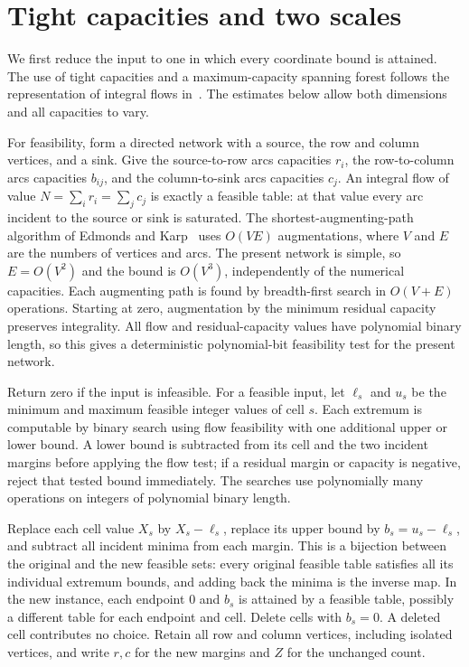 \section{Tight capacities and two scales}\label{sec:scales}

We first reduce the input to one in which every coordinate bound is
attained.  The use of tight capacities and a maximum-capacity spanning
forest follows the representation of integral flows in~\cite{CDR2010}.
The estimates below allow both dimensions and all capacities to vary.

For feasibility, form a directed network with a source, the row and
column vertices, and a sink. Give the source-to-row arcs capacities
$r_i$, the row-to-column arcs capacities $b_{ij}$, and the
column-to-sink arcs capacities $c_j$. An integral flow of value
$N=\sum_i r_i=\sum_j c_j$ is exactly a feasible table: at that value
every arc incident to the source or sink is saturated. The
shortest-augmenting-path algorithm of Edmonds and
Karp~\cite[Theorem~1]{EK1972} uses $O(VE)$ augmentations, where $V$
and $E$ are the numbers of vertices and arcs.  The present network is
simple, so $E=O(V^2)$ and the bound is $O(V^3)$, independently of the
numerical capacities. Each augmenting path is found by breadth-first
search in $O(V+E)$ operations. Starting at zero, augmentation by the
minimum residual capacity preserves integrality. All flow and residual-capacity
values have polynomial binary length, so this gives a deterministic
polynomial-bit feasibility test for the present network.

Return zero if the input is infeasible. For a feasible input, let
$\ell_s$ and $u_s$ be the minimum
and maximum feasible integer values of cell $s$.  Each extremum is
computable by binary search using flow feasibility with one additional
upper or lower bound.  A lower bound is subtracted from its cell and
the two incident margins before applying the flow test; if a residual
margin or capacity is negative, reject that tested bound immediately.
The searches
use polynomially many operations on integers of polynomial binary
length.

Replace each cell value $X_s$ by $X_s-\ell_s$, replace its upper bound
by $b_s=u_s-\ell_s$, and subtract all incident minima from each margin.
This is a bijection between the original and the new feasible sets:
every original feasible table satisfies all its individual extremum
bounds, and adding back the minima is the inverse map.  In the new
instance, each endpoint $0$ and $b_s$ is attained by a feasible table,
possibly a different table for each endpoint and cell.  Delete cells
with $b_s=0$.  A deleted cell contributes no choice.  Retain all row
and column vertices, including isolated vertices, and write $r,c$ for
the new margins and $Z$ for the unchanged count.

